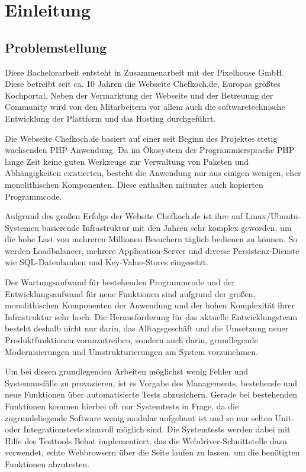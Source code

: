\section{Einleitung}

\subsection{Problemstellung}

Diese Bachelorarbeit entsteht in Zusammenarbeit mit der Pixelhouse GmbH. Diese betreibt seit ca. 10 Jahren die Webseite Chefkoch.de, Europas größtes Kochportal. Neben der Vermarktung der Webseite und der Betreuung der Community wird von den Mitarbeitern vor allem auch die softwaretechnische Entwicklung der Plattform und das Hosting durchgeführt.

Die Webseite Chefkoch.de basiert auf einer seit Beginn des Projektes stetig wachsenden PHP-Anwendung. Da im Ökosystem der Programmiersprache PHP lange Zeit keine guten Werkzeuge zur Verwaltung von Paketen und Abhängigkeiten existierten, besteht die Anwendung nur aus einigen wenigen, eher monolithischen Komponenten. Diese enthalten mitunter auch kopierten Programmcode.

Aufgrund des großen Erfolgs der Website Chefkoch.de ist ihre auf Linux/Ubuntu-Systemen basierende Infrastruktur mit den Jahren sehr komplex geworden, um die hohe Last von mehreren Millionen Besuchern täglich bedienen zu können. So werden Loadbalancer, mehrere Application-Server und diverse Persistenz-Dienste wie SQL-Datenbanken und Key-Value-Stores eingesetzt.

Der Wartungsaufwand für bestehenden Programmcode und der Entwicklungsaufwand für neue Funktionen sind aufgrund der großen, monolithischen Komponenten der Anwendung und der hohen Komplexität ihrer Infrastruktur sehr hoch. Die Herausforderung für das aktuelle Entwicklungsteam besteht deshalb nicht nur darin, das Alltagsgeschäft und die Umsetzung neuer Produktfunktionen voranzutreiben, sondern auch darin, grundlegende Modernisierungen und Umstrukturierungen am System vorzunehmen.

Um bei diesen grundlegenden Arbeiten möglichst wenig Fehler und Systemausfälle zu provozieren, ist es Vorgabe des Managements, bestehende und neue Funktionen über automatisierte Tests abzusichern. Gerade bei bestehenden Funktionen kommen hierbei oft nur Systemtests in Frage, da die zugrundeliegende Software wenig modular aufgebaut ist und so nur selten Unit- oder Integrationstests sinnvoll möglich sind. Die Systemtests werden dabei mit Hilfe des Testtools Behat implementiert, das die Webdriver-Schnittstelle dazu verwendet, echte Webbrowsern über die Seite laufen zu lassen, um die benötigten Funktionen abzutesten.

